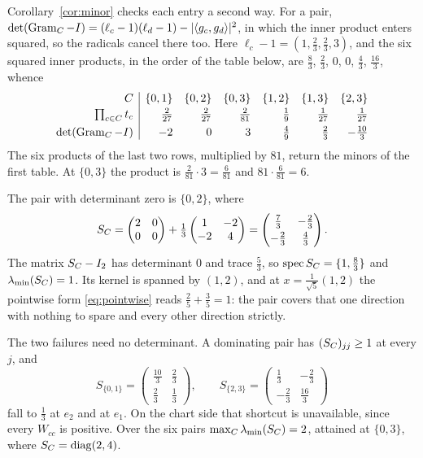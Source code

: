 \begin{example}
Corollary~\ref{cor:minor} checks each entry a second way.  For a pair,
$\det(\operatorname{Gram}_C-I)=(\ell_c-1)(\ell_d-1)-\lvert\langle
g_c,g_d\rangle\rvert^2$, in which the inner product enters squared, so the
radicals cancel there too.  Here $\ell_c-1=(1,\tfrac23,\tfrac23,3)$, and
the six squared inner products, in the order of the table below, are
$\tfrac83$, $\tfrac23$, $0$, $0$, $\tfrac43$, $\tfrac{16}3$, whence
\[
  \begin{array}{r|rrrrrr}
  C & \{0,1\} & \{0,2\} & \{0,3\} & \{1,2\} & \{1,3\} & \{2,3\}\\[2pt]
  \prod_{c\in C}t_c
    & \tfrac2{27} & \tfrac2{27} & \tfrac2{81}
    & \tfrac19 & \tfrac1{27} & \tfrac1{27}\\[4pt]
  \det(\operatorname{Gram}_C-I) & -2 & 0 & 3 & \tfrac49 & \tfrac23 & -\tfrac{10}3
  \end{array}
\]
The six products of the last two rows, multiplied by $81$, return the
minors of the first table.  At $\{0,3\}$ the product is
$\tfrac2{81}\cdot3=\tfrac6{81}$ and $81\cdot\tfrac6{81}=6$.

The pair with determinant zero is $\{0,2\}$, where
\[
  S_{C}=\begin{pmatrix}2&0\\0&0\end{pmatrix}
     +\tfrac13\begin{pmatrix}1&-2\\-2&4\end{pmatrix}
     =\begin{pmatrix}\tfrac73&-\tfrac23\\[3pt]
                     -\tfrac23&\tfrac43\end{pmatrix} .
\]
The matrix $S_{C}-I_2$ has determinant $0$ and trace $\tfrac53$, so
$\operatorname{spec}S_{C}=\{1,\tfrac83\}$ and $\lambda_{\min}(S_{C})=1$.  Its kernel is
spanned by $(1,2)$, and at $x=\tfrac1{\sqrt5}(1,2)$ the pointwise form
\eqref{eq:pointwise} reads $\tfrac25+\tfrac35=1$: the pair covers that one
direction with nothing to spare and every other direction strictly.

The two failures need no determinant.  A dominating pair has
$(S_{C})_{jj}\ge1$ at every $j$, and
\[
  S_{\{0,1\}}=\begin{pmatrix}\tfrac{10}3&\tfrac23\\[3pt]
                             \tfrac23&\tfrac13\end{pmatrix},
  \qquad
  S_{\{2,3\}}=\begin{pmatrix}\tfrac13&-\tfrac23\\[3pt]
                             -\tfrac23&\tfrac{16}3\end{pmatrix}
\]
fall to $\tfrac13$ at $e_2$ and at $e_1$.  On the chart side that shortcut
is unavailable, since every $W_{cc}$ is positive.  Over the six pairs
$\max_C\lambda_{\min}(S_{C})=2$, attained at $\{0,3\}$, where $S_{C}=\operatorname{diag}(2,4)$.
\end{example}

